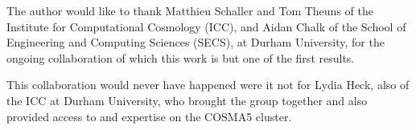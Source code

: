 \documentclass[final]{siamltex}
\begin{document}
The author would like to thank Matthieu Schaller and Tom Theuns of the
Institute for Computational Cosmology (ICC), and Aidan Chalk of the
School of Engineering and Computing Sciences (SECS), at Durham University,
for the ongoing collaboration of which this work is but one of the first
results.

This collaboration would never have happened were it not for Lydia Heck,
also of the ICC at Durham University, who brought the group together 
and also provided access to and expertise 
on the COSMA5 cluster. 


\nopagebreak

\end{document}
